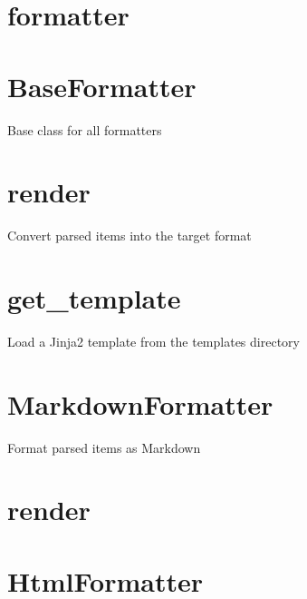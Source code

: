 \documentclass{article}
\begin{document}
\section{formatter}








\section{BaseFormatter}


Base class for all formatters







\section{render}


Convert parsed items into the target format







\section{get_template}


Load a Jinja2 template from the templates directory







\section{MarkdownFormatter}


Format parsed items as Markdown







\section{render}








\section{HtmlFormatter}
\end{document}
